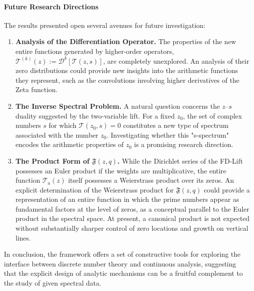 \paragraph{Future Research Directions}
The results presented open several avenues for future investigation:
\begin{enumerate}
    \item \textbf{Analysis of the Differentiation Operator.} The properties of the new entire functions generated by higher-order operators, $\mathcal{T}^{(k)}(z) := \mathcal{D}^k[\mathcal{T}(z,s)]$, are completely unexplored. An analysis of their zero distributions could provide new insights into the arithmetic functions they represent, such as the convolutions involving higher derivatives of the Zeta function.

    \item \textbf{The Inverse Spectral Problem.} A natural question concerns the $z$–$s$ duality suggested by the two-variable lift. For a fixed $z_0$, the set of complex numbers $s$ for which $\mathcal{T}(z_0, s) = 0$ constitutes a new type of spectrum associated with the number $z_0$. Investigating whether this "s-spectrum" encodes the arithmetic properties of $z_0$ is a promising research direction.

    \item \textbf{The Product Form of $\mathfrak{F}(z,q)$.} While the Dirichlet series of the FD-Lift possesses an Euler product if the weights are multiplicative, the entire function $\mathcal{T}_a(z)$ itself possesses a Weierstrass product over its zeros. An explicit determination of the Weierstrass product for $\mathfrak{F}(z,q)$ could provide a representation of an entire function in which the prime numbers appear as fundamental factors at the level of zeros, as a conceptual parallel to the Euler product in the spectral space. At present, a canonical product is not expected without substantially sharper control of zero locations and growth on vertical lines.
\end{enumerate}

In conclusion, the framework offers a set of constructive tools for exploring the interface between discrete number theory and continuous analysis, suggesting that the explicit design of analytic mechanisms can be a fruitful complement to the study of given spectral data.






